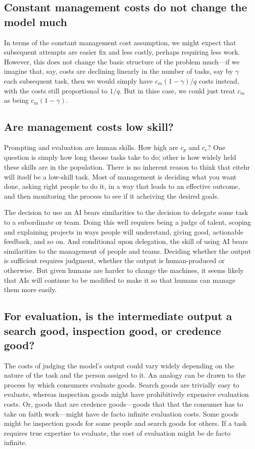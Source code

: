 \documentclass{article}
\theoremstyle{plain}
\theoremstyle{plain}
\begin{document}
\subsection{Constant management costs do not change the model much} \label{sec:constant_management_costs}
In terms of the constant management cost assumption, we might expect that subsequent attempts are easier fix and less costly, perhaps requiring less work. 
However, this does not change the basic structure of the problem much---if we imagine that, say, costs are declining linearly in the number of tasks, say by $\gamma$ each subsequent task, then we would simply have $c_m (1-\gamma) / q$ costs instead, with the costs still proportional to $1/q$. 
But in thise case, we could just treat $c_m$ as being $c_m (1-\gamma)$. 
  
\subsection{Are management costs low skill?}
Prompting and evaluation are human skills.
How high are $c_p$ and $c_e$?
One question is simply how long theose tasks take to do; other is how widely held these skills are in the population.
There is no inherent reason to think that eitehr will itself be a low-skill task.
Most of management is deciding what you want done, asking right people to do it, in a way that leads to an effective outcome, and then monitoring the process to see if it acheiving the desired goals.
  
The decision to use an AI bears similarities to the decision to delegate some task to a subordinate or team.
Doing this well requires being a judge of talent, scoping and explaining projects in ways people will understand, giving good, actionable feedback, and so on. 
And conditional upon delegation, the skill of using AI bears similarities to the management of people and teams. 
Deciding whether the output is sufficient requires judgment, whether the output is human-produced or otherwise. 
But given humans are harder to change the machines, it seems likely that AIs will continue to be modified to make it so that humans can manage them more easily. 
  
\subsection{For evaluation, is the intermediate output a search good, inspection good, or credence good?}
The costs of judging the model's output could vary widely depending on the nature of the task and the person assiged to it.
An analogy can be drawn to the process by which consumers evaluate goods. 
Search goods are trivially easy to evaluate, whereas inspection goods might have prohibitively expensive evaluation costs. 
Or, goods that are credence goods---goods that that the consumer has to take on faith work---might have de facto infinite evaluation costs.
Some goods might be inspection goods for some people and search goods for others. 
If a task requires true expertise to evaluate, the cost of evaluation might be de facto infinite.
  
\end{document}
